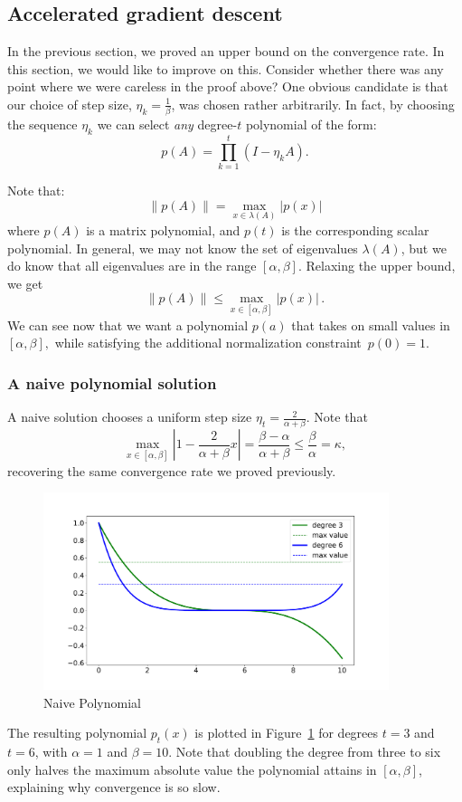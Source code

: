 \subsection{Accelerated gradient descent}
In the previous section, we proved an upper bound on the convergence rate. In this section, we would like to improve on this. Consider whether there was any point where we were careless in the proof above? One obvious candidate is that our choice of step size, $\eta_k = \frac{1}{\beta}$, was chosen rather arbitrarily. In fact, by choosing the sequence $\eta_k$ we can select \textit{any} degree-$t$ polynomial of the form:
\[
p(A) = \prod_{k=1}^t \left(I - \eta_k A\right).
\]

Note that:
\begin{equation*}
\left\|p(A)\right\| = \max_{x \in \lambda(A)} \left|p(x)\right|
\end{equation*}
where $p(A)$ is a matrix polynomial, and $p(t)$ is the corresponding scalar
polynomial. In general, we may not know the set of eigenvalues $\lambda(A)$, but
we do know that all eigenvalues are in the range $[\alpha, \beta].$ Relaxing
the upper bound, we get
\begin{equation*}
\left\|p(A)\right\| \le \max_{x \in [\alpha, \beta]} \left|p(x)\right|\,.
\end{equation*}
We can see now that we
want a polynomial $p(a)$ that takes on small values in $[\alpha, \beta],$ while 
satisfying the additional normalization constraint~$p(0) = 1.$ 

\subsubsection{A naive polynomial solution}
A naive solution chooses a uniform step size $\eta_t = \frac{2}{\alpha + \beta}$. Note that
\[
\max_{x \in [\alpha, \beta]} \left|1 - \frac{2}{\alpha + \beta} x\right| = \frac{\beta - \alpha}{\alpha + \beta} \leq \frac{\beta}{\alpha} = \kappa,
\]
recovering the same convergence rate we proved previously.
\begin{figure}[h]
\includegraphics[width=0.9\textwidth]{figures/lecture6-naive_polynome.pdf}
\centering
\caption{Naive Polynomial}
\label{naive_p}
\end{figure}
%
The resulting polynomial $p_t(x)$ is plotted in Figure~\ref{naive_p} for degrees
$t = 3$ and $t = 6$, with $\alpha = 1$ and $\beta = 10$. Note that doubling the
degree from three to six only halves the maximum absolute value the polynomial
attains in $[\alpha,\beta]$, explaining why convergence is so slow.

